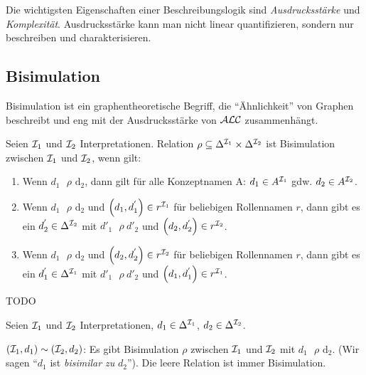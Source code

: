Die wichtigsten Eigenschaften einer Beschreibungslogik sind
\emph{Ausdrucksstärke} und \emph{Komplexität}. Ausdrucksstärke kann man nicht
linear quantifizieren, sondern nur beschreiben und charakterisieren.

\subsection{Bisimulation}\label{bisimulation}

Bisimulation ist ein graphentheoretische Begriff, die \enquote{Ähnlichkeit} von Graphen beschreibt und eng mit der Ausdrucksstärke von $\mathcal{A}\mathcal{L}\mathcal{C}$ zusammenhängt.

\begin{definition}[Bisimulation]

Seien $\mathcal{I}_{1}$ und $\mathcal{I}_{2}$ Interpretationen. Relation
$\rho \subseteq \Delta^{\mathcal{I}_{1}} \times \Delta^{\mathcal{I}_{2}}$ ist Bisimulation
zwischen $\mathcal{I}_{1}$ und $\mathcal{I}_{2}$, wenn gilt:

\begin{enumerate}
\def\labelenumi{\arabic{enumi}.}
\item
  Wenn $d_{1}\text{\ $\rho$}\text{\ d}_{2}$, dann gilt für alle
  Konzeptnamen A: $d_{1} \in A^{\mathcal{I}_{1}}$ gdw. $d_{2} \in A^{\mathcal{I}_{2}}$.
\item
  Wenn $d_{1}\text{\ $\rho$}\text{\ d}_{2}$ und
  $\left( d_{1},d_{1}^{'} \right) \in r^{\mathcal{I}_{1}}$ für beliebigen
  Rollennamen $r$, dann gibt es ein $d_{2}^{'} \in \Delta^{\mathcal{I}_{2}}$
  mit ${d'}_{1}\text{\ $\rho$}{\ d'}_{2}$ und
  $\left( d_{2},d_{2}^{'} \right) \in r^{\mathcal{I}_{2}}$.
\item
  Wenn $d_{1}\text{\ $\rho$}\text{\ d}_{2}$ und
  $\left( d_{2},d_{2}^{'} \right) \in r^{\mathcal{I}_{2}}$ für beliebigen
  Rollennamen $r$, dann gibt es ein $d_{1}^{'} \in \Delta^{\mathcal{I}_{1}}$
  mit ${d'}_{1}\text{\ $\rho$}{\ d'}_{2}$ und
  $\left( d_{1},d_{1}^{'} \right) \in r^{\mathcal{I}_{1}}$.
\end{enumerate}
\end{definition}

\begin{tafel}[TODO]
    TODO
\end{tafel}

Seien $\mathcal{I}_{1}$ und $\mathcal{I}_{2}$ Interpretationen,
$d_{1} \in \Delta^{\mathcal{I}_{1}}$, $d_{2} \in \Delta^{\mathcal{I}_{2}}$.

$(\mathcal{I}_{1},d_{1}) \sim (\mathcal{I}_{2},d_{2})$: Es gibt Bisimulation $\rho$
zwischen $\mathcal{I}_{1}$ und $\mathcal{I}_{2}$ mit $d_{1}\text{\ $\rho$}\text{\ d}_{2}$. (Wir sagen \enquote{$d_1$ ist \emph{bisimilar zu} $d_2$}).
Die leere Relation ist immer Bisimulation.

